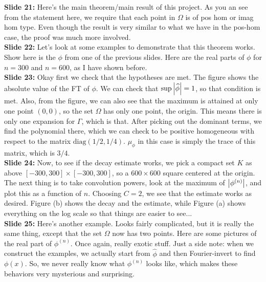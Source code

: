 \documentclass[11pt]{article}
\begin{document}
\noindent \textbf{Slide 21:} Here's the main theorem/main result of this project. As you an see from the statement here, we require that each point in $\Omega$ is of pos hom or imag hom type. Even though the result is very similar to what we have in the pos-hom case, the proof was much more involved. \\



\noindent \textbf{Slide 22:} Let's look at some examples to demonstrate that this theorem works. Show here is the $\phi$ from one of the previous slides. Here are the real parts of $\phi$ for $n=300$ and $n=600$, as I have shown before. \\


\noindent \textbf{Slide 23:} Okay first we check that the hypotheses are met. The figure shows the absolute value of the FT of $\phi$. We can check that $\sup\abs{\widehat{\phi}} = 1$, so that condition is met. Also, from the figure, we can also see that the maximum is attained at only one point $(0,0)$, so the set $\Omega$ has only one point, the origin. This means there is only one expansion for $\Gamma$, which is that. After picking out the dominant terms, we find the polynomial there, which we can check to be positive homogeneous with respect to the matrix $\text{diag}(1/2, 1/4)$. $\mu_\phi$ in this case is simply the trace of this matrix, which is $3/4$.   \\

\noindent \textbf{Slide 24:} Now, to see if the decay estimate works, we pick a compact set $K$ as above $[-300,300]\times [-300,300]$, so a $600\times 600$ square centered at the origin. The next thing is to take convolution powers, look at the maximum of $\abs{\phi^{(n)}}$, and plot this as a function of $n$. Choosing $C=2$, we see that the estimate works as desired. Figure (b) shows the decay and the estimate, while Figure (a) shows everything on the log scale so that things are easier to see...\\




\noindent \textbf{Slide 25:} Here's another example. Looks fairly complicated, but it is really the same thing, except that the set $\Omega$ now has two points. Here are some pictures of the real part of $\phi^{(n)}$. Once again, really exotic stuff. Just a side note: when we construct the examples, we actually start from $\widehat{\phi}$ and then Fourier-invert to find $\phi(x)$. So, we never really know what $\phi^{(n)}$ looks like, which makes these behaviors very mysterious and surprising.  \\
\end{document}

